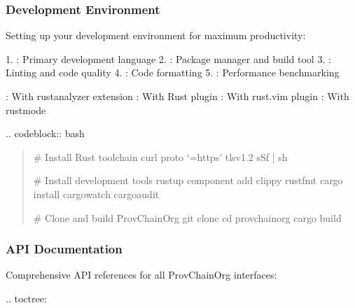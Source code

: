 \documentclass[letterpaper,10pt,english]{sphinxmanual}
\begin{document}
\subsubsection{Development Environment}
\label{\detokenize{developer/index:development-environment}}
\sphinxAtStartPar
Setting up your development environment for maximum productivity:

\sphinxAtStartPar
{}
1. : Primary development language
2. : Package manager and build tool
3. : Linting and code quality
4. : Code formatting
5. : Performance benchmarking

\sphinxAtStartPar
{}
\sphinxhyphen{} : With rust\sphinxhyphen{}analyzer extension
\sphinxhyphen{} : With Rust plugin
\sphinxhyphen{} : With rust.vim plugin
\sphinxhyphen{} : With rust\sphinxhyphen{}mode

\sphinxAtStartPar
{}
.. code\sphinxhyphen{}block:: bash
\begin{quote}

\sphinxAtStartPar
\# Install Rust toolchain
curl \textendash{}proto ‘=https’ \textendash{}tlsv1.2 \sphinxhyphen{}sSf  | sh

\sphinxAtStartPar
\# Install development tools
rustup component add clippy rustfmt
cargo install cargo\sphinxhyphen{}watch cargo\sphinxhyphen{}audit

\sphinxAtStartPar
\# Clone and build ProvChainOrg
git clone 
cd provchain\sphinxhyphen{}org
cargo build
\end{quote}


\subsubsection{API Documentation}
\label{\detokenize{developer/index:api-documentation}}
\sphinxAtStartPar
Comprehensive API references for all ProvChainOrg interfaces:

\sphinxAtStartPar
{}
.. toctree:

\begin{sphinxVerbatim}[commandchars=\\\{\}]
 
  

\end{sphinxVerbatim}
\end{document}
